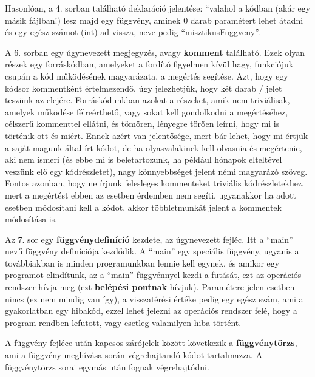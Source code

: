 Hasonlóan, a 4. sorban található deklaráció jelentése: ``valahol a kódban (akár egy másik fájlban!) lesz majd egy függvény, aminek 0 darab paramétert lehet átadni és egy egész számot (int) ad vissza, neve pedig ``misztikusFuggveny''.

A 6. sorban egy úgynevezett megjegyzés, avagy \textbf{komment} található. Ezek olyan részek egy forráskódban, amelyeket a fordító figyelmen kívül hagy, funkciójuk csupán a kód működésének magyarázata, a megértés segítése. Azt, hogy egy kódsor kommentként értelmezendő, úgy jelezhetjük, hogy két darab / jelet teszünk az elejére. Forráskódunkban azokat a részeket, amik nem triviálisak, amelyek működése félreérthető, vagy sokat kell gondolkodni a megértéséhez, célszerű kommenttel ellátni, és tömören, lényegre törően leírni, hogy mi is történik ott és miért. Ennek azért van jelentősége, mert bár lehet, hogy mi értjük a saját magunk által írt kódot, de ha olyasvalakinek kell olvasnia és megértenie, aki nem ismeri (és ebbe mi is beletartozunk, ha például hónapok elteltével veszünk elő egy kódrészletet), nagy könnyebbséget jelent némi magyarázó szöveg. Fontos azonban, hogy ne írjunk felesleges kommenteket triviális kódrészletekhez, mert a megértést ebben az esetben érdemben nem segíti, ugyanakkor ha adott esetben módosítani kell a kódot, akkor többletmunkát jelent a kommentek módosítása is.

Az 7. sor egy \textbf{függvénydefiníció} kezdete, az úgynevezett fejléc. Itt a ``main'' nevű függvény definíciója kezdődik. A ``main'' egy speciális függvény, ugyanis a továbbiakban is minden programunkban lennie kell egynek, és amikor egy programot elindítunk, az a ``main'' függvénnyel kezdi a futását, ezt az operációs rendszer hívja meg (ezt \textbf{belépési pontnak} hívjuk). Paramétere jelen esetben nincs (ez nem mindig van így), a visszatérési értéke pedig egy egész szám, ami a gyakorlatban egy hibakód, ezzel lehet jelezni az operációs rendszer felé, hogy a program rendben lefutott, vagy esetleg valamilyen hiba történt. 

A függvény fejléce után kapcsos zárójelek között következik a \textbf{függvénytörzs}, ami a függvény meghívása során végrehajtandó kódot tartalmazza. A függvénytörzs sorai egymás után fognak végrehajtódni. 

